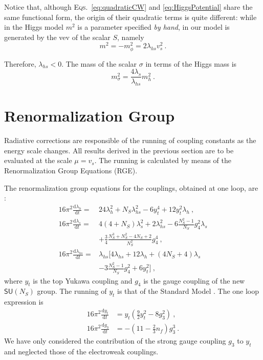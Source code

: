 \documentclass[aps,prd,preprintnumbers,nofootinbibn,twocolumn]{revtex4}
\newcommand{\dif}{\mathrm{d}}
\begin{document}
Notice that, although \textsc{Eqs.}\ \eqref{eq:quadraticCW} and \eqref{eq:HiggsPotential} share the same functional form, the origin of their quadratic terms is quite different: while in the Higgs model $m^2$ is a parameter specified \textit{by hand}, in our model is generated by the vev of the scalar $S$, namely
\begin{equation}
m^2 = -m_\phi^2 = 2 \lambda_{hs} v_s^2\ .
\end{equation}

Therefore, $\lambda_{hs} < 0$. The mass of the scalar $\sigma$ in terms of the Higgs mass is
\begin{equation}
m_\sigma^2 = \frac{4\lambda_s}{\lambda_{hs}}m_h^2\ .
\end{equation}

\section{Renormalization Group}\label{sect:RG}

Radiative corrections are responsible of the running of coupling constants as the energy scale changes. All results derived in the previous section are to be evaluated at the scale $\mu = v_s$. The running is calculated by means of the Renormalization Group Equations (RGE).

The renormalization group equations for the couplings, obtained at one loop, are \cite{Dermisek:2013pta}:
\begin{align}
16\pi^2 \frac{\dif \lambda_h}{\dif t} =& 24\lambda_h^2 + N_S \lambda_{hs}^2-6 y_t^4 +12y_t^2 \lambda_h \ ,\\
16\pi^2 \frac{\dif \lambda_s}{\dif t} =& 4(4+N_S)\lambda_s^2 + 2\lambda_{hs}^2 - 6 \frac{N_S^2-1}{N_S}g_4^2 \lambda_s \nonumber \\ &+ \frac{3}{4} \frac{N_S^3 + N_S^2-4N_S+2}{N_S^2}g_4^4 \ , \\
16\pi^2 \frac{\dif \lambda_{hs}}{\dif t} =& \lambda_{hs} \Big[ 4\lambda_{hs} +12\lambda_h +(4N_S+4)\lambda_s \nonumber \\ &-3 \frac{N_S^2-1}{N_S}g_4^2 +6y_t^2\Big]\ ,
\end{align}
where $y_t$ is the top Yukawa coupling and $g_4$ is the gauge coupling of the new $\mathsf{SU}(N_S)$ group. The running of $y_t$ is that of the Standard Model \cite{Eichhorn:2015kea}. The one loop expression is
\begin{align}
16\pi^2 \frac{\dif y_t}{\dif t} &= y_t\left(\frac{9}{2}y_t^2 -8g_3^2\right)\ ,\\
16\pi^2 \frac{\dif g_3}{\dif t} &= -\left(11-\frac{2}{3}n_f\right)g_3^3\ .
\end{align}
We have only considered the contribution of the strong gauge coupling $g_3$ to $y_t$ and neglected those of the electroweak couplings.
\end{document}
